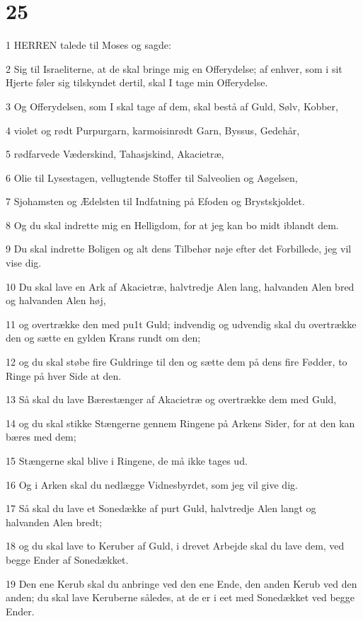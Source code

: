 \chapter{25}

\par 1 HERREN talede til Moses og sagde:
\par 2 Sig til Israeliterne, at de skal bringe mig en Offerydelse; af enhver, som i sit Hjerte føler sig tilskyndet dertil, skal I tage min Offerydelse.
\par 3 Og Offerydelsen, som I skal tage af dem, skal bestå af Guld, Sølv, Kobber,
\par 4 violet og rødt Purpurgarn, karmoisinrødt Garn, Byssus, Gedehår,
\par 5 rødfarvede Væderskind, Tahasjskind, Akacietræ,
\par 6 Olie til Lysestagen, vellugtende Stoffer til Salveolien og Aøgelsen,
\par 7 Sjohamsten og Ædelsten til Indfatning på Efoden og Brystskjoldet.
\par 8 Og du skal indrette mig en Helligdom, for at jeg kan bo midt iblandt dem.
\par 9 Du skal indrette Boligen og alt dens Tilbehør nøje efter det Forbillede, jeg vil vise dig.
\par 10 Du skal lave en Ark af Akacietræ, halvtredje Alen lang, halvanden Alen bred og halvanden Alen høj,
\par 11 og overtrække den med pu1t Guld; indvendig og udvendig skal du overtrække den og sætte en gylden Krans rundt om den;
\par 12 og du skal støbe fire Guldringe til den og sætte dem på dens fire Fødder, to Ringe på hver Side at den.
\par 13 Så skal du lave Bærestænger af Akacietræ og overtrække dem med Guld,
\par 14 og du skal stikke Stængerne gennem Ringene på Arkens Sider, for at den kan bæres med dem;
\par 15 Stængerne skal blive i Ringene, de må ikke tages ud.
\par 16 Og i Arken skal du nedlægge Vidnesbyrdet, som jeg vil give dig.
\par 17 Så skal du lave et Sonedække af purt Guld, halvtredje Alen langt og halvanden Alen bredt;
\par 18 og du skal lave to Keruber af Guld, i drevet Arbejde skal du lave dem, ved begge Ender af Sonedækket.
\par 19 Den ene Kerub skal du anbringe ved den ene Ende, den anden Kerub ved den anden; du skal lave Keruberne således, at de er i eet med Sonedækket ved begge Ender.
